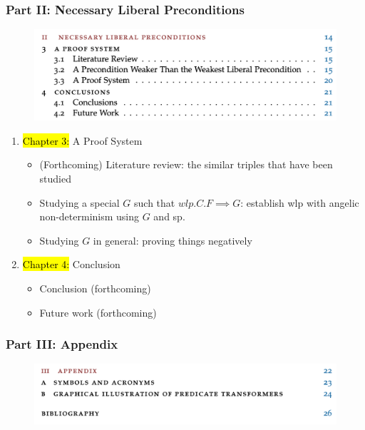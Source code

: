 \documentclass[aspectratio=169]{beamer}
\begin{document}
\begin{frame}[fragile]
	\frametitle{Part II: Necessary Liberal Preconditions}
	\begin{minipage}[t]{0.49\linewidth}	
		\begin{figure}
		\centering \includegraphics[width=\textwidth]{images/part2.png} 
	  \end{figure}
	\end{minipage}
	\begin{minipage}[t]{0.5\linewidth}
		\begin{enumerate}
				\item[] \hl{Chapter 3: }A Proof System
				\begin{itemize}
					\item (Forthcoming) Literature review: the similar triples that have been studied
					\item Studying a special $G$ such that $wlp.C.F \implies G$: establish wlp with angelic non-determinism using $G$ and sp. 
					\item Studying $G$ in general: proving things negatively
				\end{itemize}
			\item[] \hl{Chapter 4: }Conclusion
				\begin{itemize}
					\item Conclusion (forthcoming)
					\item Future work (forthcoming)
				\end{itemize}
	\end{enumerate}
	\end{minipage}
	
\end{frame}
\begin{frame}[fragile]
	\frametitle{Part III: Appendix}
	\begin{minipage}[t]{0.49\linewidth}	
		\begin{figure}
			\centering \includegraphics[width=\textwidth]{images/part3.png} 
		\end{figure}
	\end{minipage}
	\begin{minipage}[t]{0.49\linewidth}

	\end{minipage}
	
\end{frame}
\end{document}
